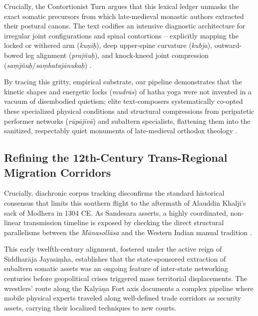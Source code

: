 \documentclass[11pt,twoside,letterpaper]{article}
\begin{document}
Crucially, the Contortionist Turn argues that this lexical ledger unmasks the exact somatic precursors from which late-medieval monastic authors extracted their postural canons. The text codifies an intensive diagnostic architecture for irregular joint configurations and spinal contortions -- explicitly mapping the locked or withered arm (\textit{ku\d{n}i\d{h}}), deep upper-spine curvature (\textit{kubja}), outward-bowed leg alignment (\textit{praj\~{n}u\d{h}}), and knock-kneed joint compression (\textit{sa\d{m}j\~{n}u\d{h}}/\textit{sa\d{m}hataj\={a}nuka\d{h}}) \citep{Berger2023}. 

By tracing this gritty, empirical substrate, our pipeline demonstrates that the kinetic shapes and energetic locks (\textit{mudr\={a}s}) of hatha yoga were not invented in a vacuum of disembodied quietism; elite text-composers systematically co-opted these specialized physical conditions and structural compressions from peripatetic performer networks (\textit{r\={u}p\={a}j\={i}v\={a}}) and subaltern specialists, flattening them into the sanitized, respectably quiet monuments of late-medieval orthodox theology \citep{Berger2023, Birch2024, Wujastyk2025}.

\subsection{Refining the 12th-Century Trans-Regional Migration Corridors}
Crucially, diachronic corpus tracking disconfirms the standard historical consensus that limits this southern flight to the aftermath of Alauddin Khalji's sack of Modhera in 1304 CE. As Sandesara asserts, a highly coordinated, non-linear transmission timeline is exposed by checking the direct structural parallelisms between the \textit{M\={a}nasoll\={a}sa} and the Western Indian manual tradition \citep{Sandesara1948}. 

This early twelfth-century alignment, fostered under the active reign of Siddhar\={a}ja Jayasi\d{m}ha, establishes that the state-sponsored extraction of subaltern somatic assets was an ongoing feature of inter-state networking centuries before geopolitical crises triggered mass territorial displacements. The wrestlers' route along the Kaly\={a}\d{n}a Fort axis documents a complex pipeline where mobile physical experts traveled along well-defined trade corridors as security assets, carrying their localized techniques to new courts.

\end{document}
